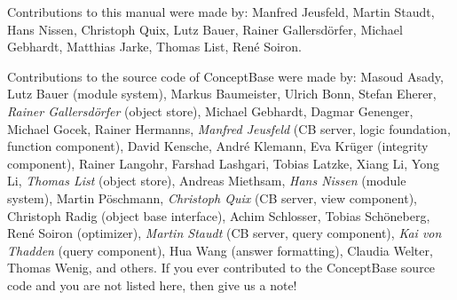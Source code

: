 \begin{titlepage}
\vfill

Contributions to this manual were made by: Manfred Jeusfeld, Martin Staudt, 
Hans Nissen, Christoph Quix, Lutz Bauer, Rainer
Gallersd\"orfer, Michael Gebhardt, Matthias Jarke, 
Thomas List, Ren\'e Soiron.

\vspace{0.7cm}

Contributions to the source code of ConceptBase were made by: Masoud Asady, Lutz Bauer (module system),
Markus Baumeister, Ulrich Bonn, Stefan Eherer, 
{\it Rainer Gallersd\"orfer\/} (object store), Michael Gebhardt, Dagmar Genenger, Michael Gocek, Rainer Hermanns,
{\it Manfred Jeusfeld\/} (CB server, logic foundation, function component), 
David Kensche, Andr\'e Klemann, 
Eva Kr\"uger (integrity component),
Rainer Langohr, Farshad Lashgari, Tobias Latzke, Xiang Li, Yong Li, 
{\it Thomas List\/} (object store), Andreas Miethsam, {\it Hans Nissen\/} (module system), 
Martin P\"oschmann, 
{\it Christoph Quix\/} (CB server, view component), Christoph Radig (object base interface),
Achim Schlosser, Tobias Sch\"oneberg,
Ren\'e Soiron (optimizer), 
{\it Martin Staudt\/} (CB server, query component), {\it Kai von Thadden\/} (query component), Hua Wang (answer formatting),
Claudia Welter, Thomas Wenig, and others.
If you ever contributed to the ConceptBase source code and
you are not listed here, then give us a note! 

\end{titlepage}


